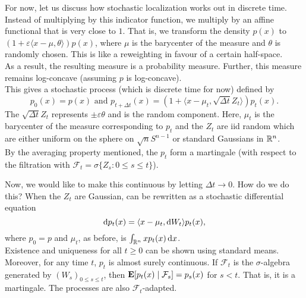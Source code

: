 		For now, let us discuss how stochastic localization works out in discrete time. Instead of multiplying by this indicator function, we multiply by an affine functional that is very close to $1$. That is, we transform the density $p(x)$ to $(1 + \varepsilon\langle x-\mu,\theta\rangle)p(x)$, where $\mu$ is the barycenter of the measure and $\theta$ is randomly chosen. This is like a reweighting in favour of a certain half-space.\\
		As a result, the resulting measure is a probability measure. Further, this measure remains log-concave (assuming $p$ is log-concave).\\
		This gives a stochastic process (which is discrete time for now) defined by
		\begin{equation}
			\label{eqn: discrete time stochastic localization}
			p_0(x) = p(x) \text{ and } p_{t+\Delta t}(x) = (1 + \langle x-\mu_t,\sqrt{\Delta t}Z_t\rangle) p_t(x).
		\end{equation}
		The $\sqrt{\Delta t}Z_t$ represents $\pm \varepsilon\theta$ and is the random component. Here, $\mu_t$ is the barycenter of the measure corresponding to $p_t$ and the $Z_t$ are iid random which are either uniform on the sphere on $\sqrt{n}S^{n-1}$ or standard Gaussians in $\mathbb{R}^n$.\\
		By the averaging property mentioned, the $p_t$ form a martingale (with respect to the filtration with $\mathcal{F}_t = \sigma\{Z_s : 0\leq s\leq t\}$).

		Now, we would like to make this continuous by letting $\Delta t\to 0$. How do we do this? When the $Z_t$ are Gaussian,  can be rewritten as a stochastic differential equation
		\begin{equation}
			\label{eqn: continuous time stochastic localization density}
			\d{p}_t(x) = \langle x-\mu_t,\d{W}_t\rangle p_t(x),%
		\end{equation}
		where $p_0=p$ and $\mu_t$, as before, is $\int_{\mathbb{R}^n} x p_t(x) \operatorname{d}\!{x}$.\\
		Existence and uniqueness for all $t\geq 0$ can be shown using standard means. Moreover, for any time $t$, $p_t$ is almost surely continuous. If $\mathcal{F}_t$ is the $\sigma$-algebra generated by $(W_s)_{0\leq s\leq t}$, then $\textbf{E}[p_t(x) \mid \mathcal{F}_s] = p_s(x)$ for $s<t$. That is, it is a martingale. The processes are also $\mathcal{F}_t$-adapted.\\

